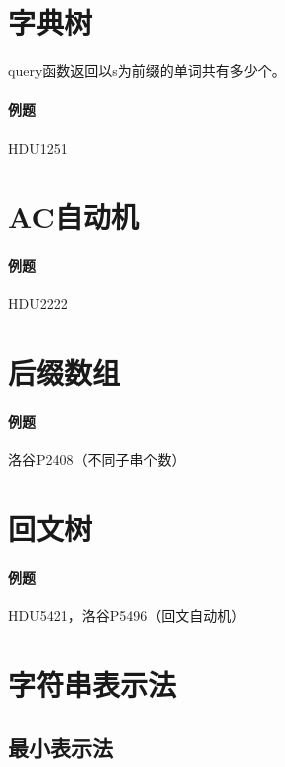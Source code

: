 

\section{字典树}

query函数返回以s为前缀的单词共有多少个。

\paragraph{例题} HDU1251



\section{AC自动机}

\paragraph{例题} HDU2222



\section{后缀数组}

\paragraph{例题} 洛谷P2408（不同子串个数）



\section{回文树}

\paragraph{例题} HDU5421，洛谷P5496（回文自动机）



\section{字符串表示法}

\subsection{最小表示法}

